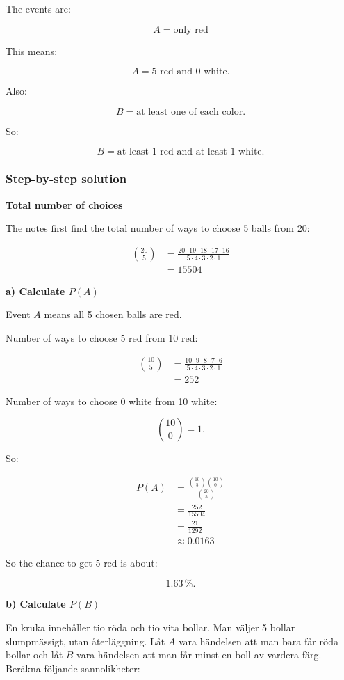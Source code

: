 \documentclass[10pt]{article}
\begin{document}
The events are:

\[
A=\text{only red}
\]

This means:

\[
A=\text{5 red and 0 white}.
\]

Also:

\[
B=\text{at least one of each color}.
\]

So:

\[
B=\text{at least 1 red and at least 1 white}.
\]

\subsubsection*{Step-by-step solution}

\textbf{Total number of choices}

The notes first find the total number of ways to choose 5 balls
from 20:

\begin{align*}
\binom{20}{5}
&=
\frac{20\cdot 19\cdot 18\cdot 17\cdot 16}
{5\cdot 4\cdot 3\cdot 2\cdot 1} \\[2mm]
&=15504
\end{align*}

\textbf{a) Calculate $P(A)$}

Event $A$ means all 5 chosen balls are red.

Number of ways to choose 5 red from 10 red:

\begin{align*}
\binom{10}{5}
&=
\frac{10\cdot 9\cdot 8\cdot 7\cdot 6}
{5\cdot 4\cdot 3\cdot 2\cdot 1} \\[2mm]
&=252
\end{align*}

Number of ways to choose 0 white from 10 white:

\[
\binom{10}{0}=1.
\]

So:

\begin{align*}
P(A)
&=
\frac{
\binom{10}{5}\binom{10}{0}
}
{\binom{20}{5}} \\[2mm]
&=
\frac{252}{15504} \\[2mm]
&=
\frac{21}{1292} \\[2mm]
&\approx 0.0163
\end{align*}

So the chance to get 5 red is about:

\[
1.63\,\%.
\]

\textbf{b) Calculate $P(B)$}

En kruka innehåller tio röda och tio vita bollar.
Man väljer 5 bollar slumpmässigt, utan återläggning.
Låt $A$ vara händelsen att man bara får röda bollar och låt
$B$ vara händelsen att man får minst en boll av vardera färg.
Beräkna följande sannolikheter:
\end{document}
